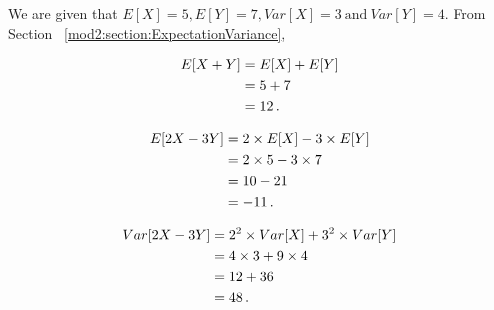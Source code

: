 %
%

\begin{subquestions}
	

\subquestion

We are given that $E[X]=5, E[Y]=7, Var[X]=3 ~\text{and}~ Var[Y]=4$. From Section ~\ref{mod2:section:ExpectationVariance},

\begin{subsubquestions}
	
\subsubquestion

\begin{align}
	E[X+Y] & = E[X] + E[Y] \nonumber \\
	       & = 5 + 7 \nonumber \\
	       & = 12 \,.
\end{align}


\subsubquestion

\begin{align}
	E[2X-3Y] & = 2 \times E[X] - 3 \times E[Y] \nonumber \\
	& = 2 \times 5 - 3 \times 7 \nonumber \\
	& = 10 - 21 \nonumber \\
	& = -11 \,.
\end{align}


\subsubquestion

\begin{align}
	Var[2X-3Y] & = 2^2 \times Var[X] + 3^2 \times Var[Y] \nonumber \\
	           & = 4 \times 3 + 9 \times 4 \nonumber \\
	           & = 12 + 36 \nonumber \\
	           & = 48 \,.	
\end{align}


\end{subsubquestions}
\end{subquestions}

